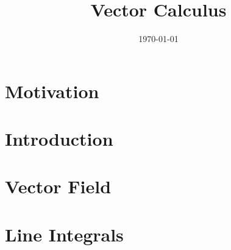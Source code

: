 \documentclass{article}
\title{Vector Calculus}
\author{}
\date{\today}
\begin{document}
	\maketitle

	\section{Motivation}
	\label{sec: motivation}
	

	\section{Introduction}
	\label{sec: introduction}
	
	
	\section{Vector Field}
	\label{sec: vector field}
	
		

	\section{Line Integrals}
	\label{sec: line integrals}
	

	
	
\end{document}

